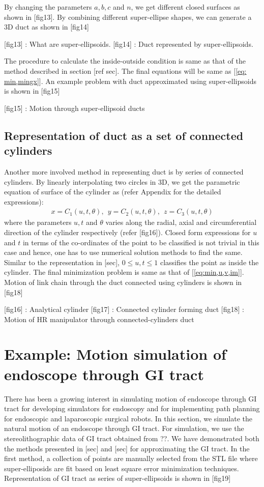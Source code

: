 \documentclass[12pt,a4]{article}
\begin{document}
By changing the parameters $a,b,c$ and $n$, we get different closed surfaces as shown in [fig13]. By combining different super-ellipse shapes, we can generate a 3D duct as shown in [fig14]

[fig13] : What are super-ellipsoids.
[fig14] : Duct represented by super-ellipsoids.

The procedure to calculate the inside-outside condition is same as that of the method described in section [ref sec]. The final equations will be same as [\ref{eq: min,mingx}]. An example problem with duct approximated using super-ellipsoids is shown in [fig15]

[fig15] : Motion through super-ellipsoid ducts


\subsection{Representation of duct as a set of connected cylinders}
Another more involved method in representing duct is by series of connected cylinders. By linearly interpolating two circles in 3D, we get the parametric equation of surface of the cylinder as (refer Appendix for the detailed expressions):
\begin{align}
\label{eq:cylinder}
x = C_1(u,t,\theta),~~y = C_2(u,t,\theta),~~z = C_3(u,t,\theta)
\end{align}
where the parameters $u,t$ and $\theta$ varies along the radial, axial and circumferential direction of the cylinder respectively (refer [fig16]). Closed form expressions for $u$ and $t$ in terms of the co-ordinates of the point  to be classified is not trivial in this case and hence, one has to use numerical solution methods to find the same. Similar to the representation in [sec], $0\leq u,t \leq 1$ classifies the point as inside the cylinder. The final minimization problem is same as that of [\ref{eq:min,u,v,im}]. Motion of link chain through the duct connected using cylinders is shown in [fig18]

[fig16] : Analytical cylinder
[fig17] : Connected cylinder forming duct
[fig18] : Motion of HR manipulator through connected-cylinders duct

\section{Example: Motion simulation of endoscope through GI tract}
There has been a growing interest in simulating motion of endoscope through GI tract for developing simulators for endoscopy and for implementing path planning for endoscopic and laparoscopic surgical robots. In this section, we simulate the natural motion of an endoscope through GI tract. For simulation, we use the stereolithographic data of GI tract obtained from ??. We have demonstrated both the methods presented in [sec] and [sec] for approximating the GI tract. In the first method, a collection of points are manually selected from the STL file where super-elliposids are fit based on least square error minimization techniques. Representation of GI tract as series of super-ellipsoids is shown in [fig19]
\end{document}
